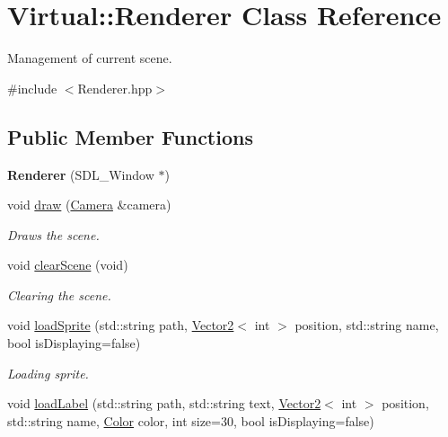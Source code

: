 \hypertarget{class_virtual_1_1_renderer}{}\section{Virtual\+:\+:Renderer Class Reference}
\label{class_virtual_1_1_renderer}


Management of current scene.  




{\ttfamily \#include $<$Renderer.\+hpp$>$}

\subsection*{Public Member Functions}
\begin{DoxyCompactItemize}
\item 
\hypertarget{class_virtual_1_1_renderer_a2474ee636beae9079b5283c4c5729acc}{}\label{class_virtual_1_1_renderer_a2474ee636beae9079b5283c4c5729acc} 
{\bfseries Renderer} (S\+D\+L\+\_\+\+Window $\ast$)
\item 
void \hyperlink{class_virtual_1_1_renderer_ae1151907121db309b9d1b650b3dbe076}{draw} (\hyperlink{class_virtual_1_1_camera}{Camera} \&camera)
\begin{DoxyCompactList}\small\item\em Draws the scene. \end{DoxyCompactList}\item 
void \hyperlink{class_virtual_1_1_renderer_a2c4ba07e2388d77606f77cf10e5af0d1}{clear\+Scene} (void)
\begin{DoxyCompactList}\small\item\em Clearing the scene. \end{DoxyCompactList}\item 
void \hyperlink{class_virtual_1_1_renderer_a55910b43e187352052f2b51019fd16ef}{load\+Sprite} (std\+::string path, \hyperlink{struct_virtual_1_1_vector2}{Vector2}$<$ int $>$ position, std\+::string name, bool is\+Displaying=false)
\begin{DoxyCompactList}\small\item\em Loading sprite. \end{DoxyCompactList}\item 
void \hyperlink{class_virtual_1_1_renderer_a6addf8a58c9024701a5da4fe814561e8}{load\+Label} (std\+::string path, std\+::string text, \hyperlink{struct_virtual_1_1_vector2}{Vector2}$<$ int $>$ position, std\+::string name, \hyperlink{struct_virtual_1_1_color}{Color} color, int size=30, bool is\+Displaying=false)

\end{DoxyCompactItemize}
